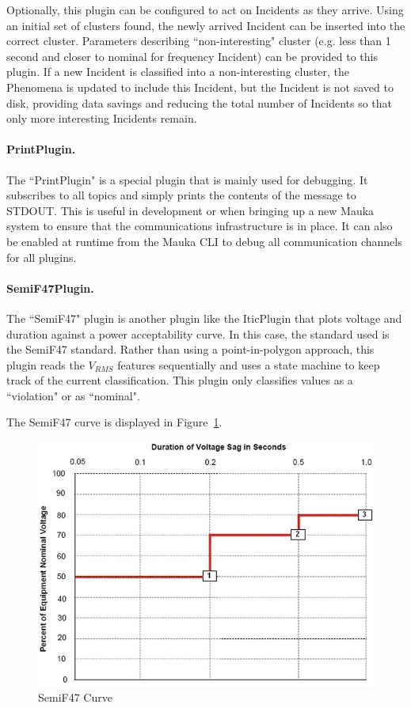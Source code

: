 Optionally, this plugin can be configured to act on Incidents as they arrive. Using an initial set of clusters found, the newly arrived Incident can be inserted into the correct cluster. Parameters describing ``non-interesting" cluster (e.g. less than 1 second and closer to nominal for frequency Incident) can be provided to this plugin. If a new Incident is classified into a non-interesting cluster, the Phenomena is updated to include this Incident, but the Incident is not saved to disk, providing data savings and reducing the total number of Incidents so that only more interesting Incidents remain.

\paragraph{PrintPlugin.}
The ``PrintPlugin" is a special plugin that is mainly used for debugging. It subscribes to all topics and simply prints the contents of the message to STDOUT. This is useful in development or when bringing up a new Mauka system to ensure that the communications infrastructure is in place. It can also be enabled at runtime from the Mauka CLI to debug all communication channels for all plugins.

\paragraph{SemiF47Plugin.}
The ``SemiF47" plugin is another plugin like the IticPlugin that plots voltage and duration against a power acceptability curve. In this case, the standard used is the SemiF47 standard\cite{semif47}. Rather than using a point-in-polygon approach, this plugin reads the $V_{RMS}$ features sequentially and uses a state machine to keep track of the current classification. This plugin only classifies values as a ``violation" or as ``nominal".

The SemiF47 curve is displayed in Figure~\ref{fig:SemiF47Curve}.

\begin{figure}
	\centering
	\includegraphics[width=0.6\linewidth]{figures/semif47.jpg}
	\caption{SemiF47 Curve}
	\label{fig:SemiF47Curve}
\end{figure}

